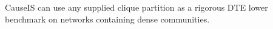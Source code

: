 CauseIS can use any supplied clique partition as a rigorous DTE lower benchmark on networks containing dense communities.